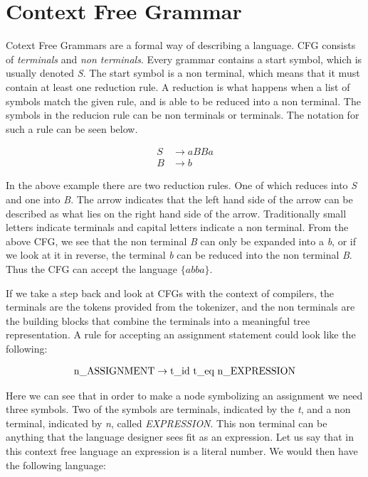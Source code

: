 \section{Context Free Grammar}

Cotext Free Grammars are a formal way of describing a language. 
CFG consists of \textit{terminals} and \textit{non terminals}. Every grammar contains a start symbol, which is usually denoted \textit{S}. The start symbol is a non terminal, which means that it must contain at least one reduction rule. A reduction is what happens when a list of symbols match the given rule, and is able to be reduced into a non terminal. The symbols in the reducion rule can be non terminals or terminals. The notation for such a rule can be seen below.


\begin{equation*}
  \begin{split}
      S &\rightarrow aBBa \\
      B &\rightarrow b
  \end{split}
\end{equation*}

In the above example there are two reduction rules. One of which reduces into \textit{S} and one into \textit{B}. The arrow indicates that the left hand side of the arrow can be described as what lies on the right hand side of the arrow. Traditionally small letters indicate terminals and capital letters indicate a non terminal. From the above CFG, we see that the non terminal \textit{B} can only be expanded into a \textit{b}, or if we look at it in reverse, the terminal \textit{b} can be reduced into the non terminal \textit{B}. Thus the CFG can accept the language $\{abba\}$.

If we take a step back and look at CFGs with the context of compilers, the terminals are the tokens provided from the tokenizer, and the non terminals are the building blocks that combine the terminals into a meaningful tree representation. A rule for accepting an assignment statement could look like the following:

\begin{equation*}
  \begin{split}
      \text{\text{n\textunderscore ASSIGNMENT}} &\rightarrow \text{\text{t\textunderscore id}   \text{t\textunderscore eq}   \text{n\textunderscore EXPRESSION}} \\
  \end{split}
\end{equation*}

Here we can see that in order to make a node symbolizing an assignment we need three symbols. Two of the symbols are terminals, indicated by the \textit{t}, and a non terminal, indicated by \textit{n}, called \textit{EXPRESSION}. This non terminal can be anything that the language designer sees fit as an expression. Let us say that in this context free language an expression is a literal number. We would then have the following language:

